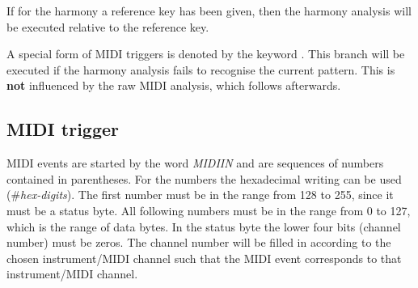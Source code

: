 \iffalse
Bei einer Harmonieform\index{Harmonieform} wird überprüft,
ob die Harmonie relativ zu jedem
Ton der Fundamentaltonleiter zutrifft. Wird eine solchermaßen
verschobene Harmonie erkannt, gilt der Auslöser als erfüllt
und der Wert \keyword{ABSTAND}\index{ABSTAND} wird entsprechend der
Harmonieanalyse gesetzt.
\fi

If for the harmony a reference key has been
given, then the harmony analysis will be executed relative to the
reference key.

\iffalse
Wenn bei der Harmonie eine Bezugstaste\index{Bezugstaste}
 angegeben wurde, dann wird
die Harmonie-Analyse relativ um die Bezugstaste verschoben
durchgeführt.
\fi

A special form of MIDI triggers is denoted by the keyword
. This branch will be executed if the harmony analysis
fails to recognise the current pattern. This is \textbf{not}
influenced by the raw MIDI analysis, which follows afterwards.



\subsection{MIDI trigger}\label{sec:midi-ereignisse}
MIDI events are started by the word \textit{MIDIIN} and
are sequences of numbers contained in parentheses. For the numbers the
hexadecimal writing can be used (\#\textit{hex-digits}).
The first number must be in the range from 128 to 255, since it must
be a status byte. All following numbers must be in the range from 0 to
127, which is the range of data bytes. In the status byte the lower
four bits (channel number) must be zeros. The channel number will be
filled in according to the chosen instrument/MIDI channel such that
the MIDI event corresponds to that instrument/MIDI channel.

\iffalse %
The status bytes\index{status byte} \textit{note on (\#90)},
\textit{note off (\#80)} and \textit{system byte (\#F0 --- \#FF)} are
not considered in the MIDI analysis.
\fi

\iffalse
MIDI-Ereignisse werden mit dem Wort {\it MIDIIN}\index{MIDIIN}
eingeleitet und
sind eine eingeklammerte Folge von Zahlen. Bei Zahlen ist die sedezimale
Schreibweise zulässig (\#{\it ziffern}).\index{*#@\#}
Die erste Zahl muss im Bereich von
128 bis 255 liegen, also ein Status-Byte sein. Alle weiteren Zahlen
müssen im Bereich von 0 bis 127 liegen, also Daten-Bytes sein.
Beim Status-Byte müssen die unteren vier Bits (Kanal-Nummer) auf Null stehen.
Die tatsächliche Kanalnummer wird dem jeweiligen
Instrument/MIDI-Kanal zugeordnet,
so daß ein MIDI-Ereignis sich jeweils auf das richtige
Instrument/MIDI-Kanal bezieht.
Die Status-Bytes\index{Status-Byte}
 {\it Note-On\index{Note-On} (\#90)}, {\it Note-Off\index{Note-Off}
  (\#80)} und
{\it System-Byte\index{System-Byte}
 (\#F0 - \#FF)} werden nicht in die MIDI-Analyse
einbezogen.
\fi

